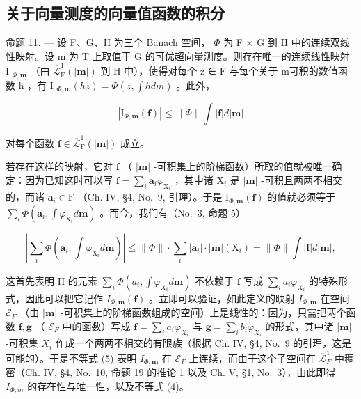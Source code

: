 \subsection{关于向量测度的向量值函数的积分}

命题 11. --- 设 F、G、H 为三个 Banach 空间， \(\Phi\) 为 F × G 到 H 中的连续双线性映射。设 m 为 T 上取值于 G 的可优超向量测度。则存在唯一的连续线性映射 I \(_{\Phi,\mathbf{m}}\) （由 \(\overline{\mathcal{L}}_{\mathrm{F}}^{1}(|\mathbf{m}|)\) 到 H 中），使得对每个 z ∈ F 与每个关于 \textbar m\textbar 可积的数值函数 h ，有 I \(_{\Phi,\mathbf{m}}(hz) = \Phi(z, \int h dm)\) 。此外，

\[
\left| \mathrm{I} _ {\Phi , \mathbf {m}} (\mathbf {f}) \right| \leqslant \| \Phi \| \int | \mathbf {f} | d | \mathbf {m} |\tag{4}
\]

对每个函数 \(\mathbf{f} \in \overline{\mathcal{L}}_{\mathrm{F}}^{1}(|\mathbf{m}|)\) 成立。

若存在这样的映射，它对 \(\mathbf{f}\) （ \(|\mathbf{m}|\) -可积集上的阶梯函数）所取的值就被唯一确定：因为已知这时可以写 \(\mathbf{f} = \sum_{i} \mathbf{a}_{i} \varphi_{\mathrm{X}_{i}}\) ，其中诸 \(\mathrm{X}_{i}\) 是 \(|\mathbf{m}|\) -可积且两两不相交的，而诸 \(\mathbf{a}_{i} \in \mathrm{F}\) （Ch. IV, §4, No.~9, 引理）。于是 \(\mathrm{I}_{\Phi, \mathbf{m}}(\mathbf{f})\) 的值就必须等于 \(\sum_{i} \Phi(\mathbf{a}_{i}, \int \varphi_{\mathrm{X}_{i}} d\mathbf{m})\) 。而今，我们有（No.~3, 命题 5）

\[
\left| \sum_ {i} \Phi (\mathbf {a} _ {i}, \int \varphi_ {\mathrm{X} _ {i}} d \mathbf {m}) \right| \leqslant \| \Phi \| \cdot \sum_ {i} | \mathbf {a} _ {i} | \cdot | \mathbf {m} | (\mathrm{X} _ {i}) = \| \Phi \| \int | \mathbf {f} | d | \mathbf {m} |,\tag{5}
\]

这首先表明 H 的元素 \(\sum_{i} \Phi(a_i, \int \varphi_{X_i} d\mathbf{m})\) 不依赖于 \(\mathbf{f}\) 写成 \(\sum_{i} a_i \varphi_{X_i}\) 的特殊形式，因此可以把它记作 \(I_{\Phi, \mathbf{m}}(\mathbf{f})\) 。立即可以验证，如此定义的映射 \(I_{\Phi, \mathbf{m}}\) 在空间 \(\mathcal{E}_F\) （由 \(|\mathbf{m}|\) -可积集上的阶梯函数组成的空间）上是线性的：因为，只需把两个函数 \(\mathbf{f}, \mathbf{g}\) （ \(\mathcal{E}_F\) 中的函数）写成 \(\mathbf{f} = \sum_{i} a_i \varphi_{X_i}\) 与 \(\mathbf{g} = \sum_{i} b_i \varphi_{X_i}\) 的形式，其中诸 \(|\mathbf{m}|\) -可积集 \(X_i\) 作成一个两两不相交的有限族（根据 Ch. IV, §4, No.~9 的引理，这是可能的）。于是不等式 (5) 表明 \(I_{\Phi, \mathbf{m}}\) 在 \(\mathcal{E}_F\) 上连续，而由于这个子空间在 \(\overline{\mathscr{L}}_F^1\) 中稠密（Ch. IV, §4, No.~10, 命题 19 的推论 1 以及 Ch. V, §1, No.~3），由此即得 \(I_{\Phi,m}\) 的存在性与唯一性，以及不等式 (4)。

